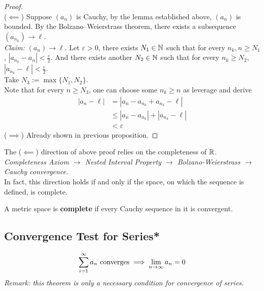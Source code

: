 \documentclass[11pt]{article}
\begin{document}
	\begin{proof} \quad \\
		($\impliedby$) Suppose $(a_n)$ is Cauchy, by the lemma established above, $(a_n)$ is bounded. By the Bolzano–Weierstrass theorem, there exists a subsequence $(a_{n_k}) \to \ell$. \\
		\emph{Claim:} $(a_n) \to \ell$. Let $\varepsilon > 0$, there exists $N_1 \in \mathbb{N}$ such that for every $n_k, n \geq N_1$, $|a_{n_k} - a_n| < \frac{\varepsilon}{2}$. 
		And there exists another $N_2 \in \mathbb{N}$ such that for every $n_k \geq N_2$, $|a_{n_k} - \ell| < \frac{\varepsilon}{2}$. \\
		Take $N_3 := \max\{N_1, N_2\}$. \\
		Note that for every $n \geq N_3$, one can choose some $n_k \geq n$ as leverage and derive
		\begin{align}
			|a_n - \ell| &= |a_n - a_{n_k} + a_{n_k} - \ell| \\
			&\leq |a_n - a_{n_k}| + |a_{n_k} - \ell| \\
			&< \varepsilon
		\end{align}
		($\implies$) Already shown in previous proposition.
	\end{proof}
	
	\begin{remark}
		The ($\impliedby$) direction of above proof relies on the completeness of $\mathbb{R}$. \\
		\emph{Completeness Axiom $\rightarrow$ Nested Interval Property $\rightarrow$ Bolzano-Weierstrass $\rightarrow$ Cauchy convergence.} \\
		In fact, this direction holds if and only if the space, on which the sequence is defined, is complete.
	\end{remark}
	
	\begin{definition}
		A metric space is \textbf{complete} if every Cauchy sequence in it is convergent.
	\end{definition}
	
	\subsection{Convergence Test for Series*}
	\begin{theorem}
		\begin{align}
			\sum_{i=1}^\infty a_n \text{{ converges}} \implies \lim_{n \to \infty} a_n = 0
		\end{align}
		\emph{Remark: this theorem is only a necessary condition for convergence of series.}
	\end{theorem}
	
\end{document}

